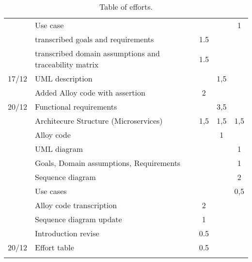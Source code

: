 \begin{center}
\begin{longtable}{llccc}
        	&	Use case	&		&		&	1	\\
        	&	transcribed goals and requirements	&	1.5	&		&		\\
     	    &	transcribed domain assumptions and traceability matrix   	&	1.5	&		&		\\
        \hline
        17/12	&	UML description	&		&	1,5	&		\\
        	&	Added Alloy code with assertion	&	2	&		&		\\
        \hline
        20/12	&	Functional requirements	&		&	3,5	&		\\
        	&	Architecure Structure (Microservices)	&	1,5	&	1,5	&	1,5	\\
        	&	Alloy code	&		&	1	&		\\
        	&	UML diagram	&		&		&	1	\\
        	&	Goals, Domain assumptions, Requirements	&		&		&	1	\\
        	&	Sequence diagram	&		&		&	2	\\
        	&	Use cases	&		&		&	0,5	\\
        	&	Alloy code transcription	&	2	&		&		\\
        	&	Sequence diagram update	&	1	&		&		\\
        	&	Introduction revise	&	0.5	&		&		\\
        \hline
        20/12 & Effort table & 0.5 &    & \\
        \hline
        
        \rowcolor{white}\caption{\label{tab:effort}Table of efforts.}
        
    \end{longtable}
\end{center}